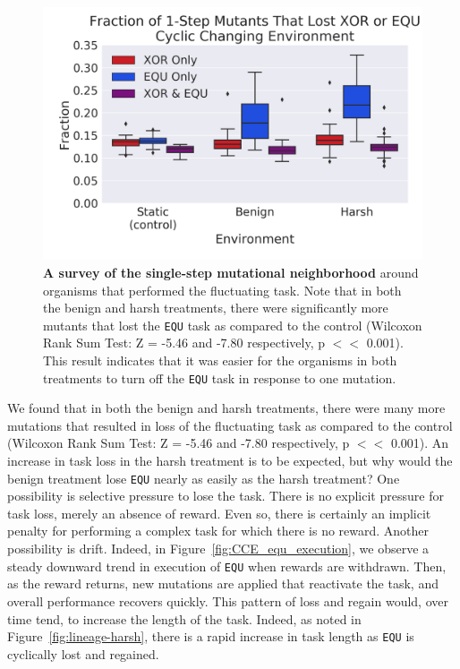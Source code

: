 \documentclass[10pt,letterpaper,final]{article}
\begin{document}
	\begin{figure}[!h] %
	\includegraphics[width=0.95\columnwidth]{figures/CE/CCE_frac_1step__box.png}
	\caption{\textbf{A survey of the single-step mutational neighborhood} around organisms that performed the fluctuating task. Note that in both the benign and harsh treatments, there were significantly more mutants that lost the \texttt{EQU} task as compared to the control (Wilcoxon Rank Sum Test: Z = -5.46 and -7.80 respectively, p $<<$ 0.001). This result indicates that it was easier for the organisms in both treatments to turn off the \texttt{EQU} task in response to one mutation. 
	}\label{fig:CCE_single_step}
	\end{figure}


We found that in both the benign and harsh treatments, there were many more mutations that resulted in loss of the fluctuating task as compared to the control (Wilcoxon Rank Sum Test: Z = -5.46 and -7.80 respectively, p $<<$ 0.001). An increase in task loss in the harsh treatment is to be expected, but why would the benign treatment lose \texttt{EQU} nearly as easily as the harsh treatment? One possibility is selective pressure to lose the task. There is no explicit pressure for task loss, merely an absence of reward. Even so, there is certainly an implicit penalty for performing a complex task for which there is no reward. Another possibility is drift. Indeed, in Figure~\ref{fig:CCE_equ_execution}, we observe a steady downward trend in execution of \texttt{EQU} when rewards are withdrawn. Then, as the reward returns, new mutations are applied that reactivate the task, and overall performance recovers quickly. This pattern of loss and regain would, over time tend, to increase the length of the task. Indeed, as noted in Figure~\ref{fig:lineage-harsh}, there is a rapid increase in task length as \texttt{EQU} is cyclically lost and regained. 
\end{document}
